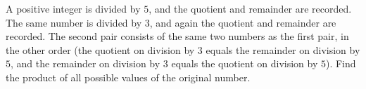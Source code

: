 A positive integer is divided by $5$, and the quotient and remainder are recorded. The same number is divided by $3$, and again the quotient and remainder are recorded. The second pair consists of the same two numbers as the first pair, in the other order (the quotient on division by $3$ equals the remainder on division by $5$, and the remainder on division by $3$ equals the quotient on division by $5$). Find the product of all possible values of the original number.
